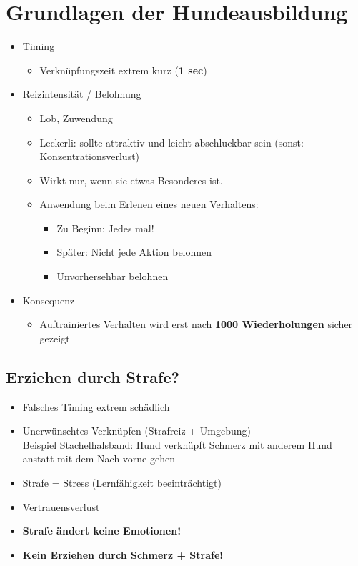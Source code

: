 \section{Grundlagen der Hundeausbildung}

\begin{itemize}
    \item Timing
    \begin{itemize}
        \item Verknüpfungszeit extrem kurz (\textbf{1 sec})
    \end{itemize}
    \item Reizintensität / Belohnung
        \begin{itemize}
            \item Lob, Zuwendung
            \item Leckerli: sollte attraktiv und leicht abschluckbar sein (sonst: Konzentrationsverlust)
            \item Wirkt nur, wenn sie etwas Besonderes ist.
            \item Anwendung beim Erlenen eines neuen Verhaltens:
                \begin{itemize}
                    \item Zu Beginn: Jedes mal!
                    \item Später: Nicht jede Aktion belohnen
                    \item \glqq Unvorhersehbar\grqq{} belohnen
                \end{itemize}
        \end{itemize}
    \item Konsequenz
        \begin{itemize}
            \item Auftrainiertes Verhalten wird erst nach \textbf{1000 Wiederholungen} sicher gezeigt
        \end{itemize}
\end{itemize}

    \subsection{Erziehen durch Strafe?}
        \begin{itemize}
            \item Falsches Timing extrem schädlich
            \item Unerwünschtes Verknüpfen (Strafreiz + Umgebung) \\
                  Beispiel Stachelhalsband: Hund verknüpft Schmerz mit anderem Hund anstatt mit dem \glqq Nach vorne gehen\grqq{}
            \item Strafe = Stress (Lernfähigkeit beeinträchtigt)
            \item Vertrauensverlust
            \item \textbf{Strafe ändert keine Emotionen!}
            \item \textbf{Kein Erziehen durch Schmerz + Strafe!}
        \end{itemize}

